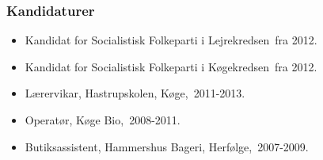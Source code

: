 \documentclass[11pt, a4paper]{awesome-cv}
\begin{document}
\begin{cvletter}
\subsubsection*{Kandidaturer}
\begin{itemize}
\item Kandidat for Socialistisk Folkeparti i Lejrekredsen fra 2012.
\item Kandidat for Socialistisk Folkeparti i Køgekredsen fra 2012.
\end{itemize}
\begin{itemize}
\item Lærervikar, Hastrupskolen, Køge, 2011-2013.
\item Operatør, Køge Bio, 2008-2011.
\item Butiksassistent, Hammershus Bageri, Herfølge, 2007-2009.
\end{itemize}
\end{cvletter}
\end{document}
